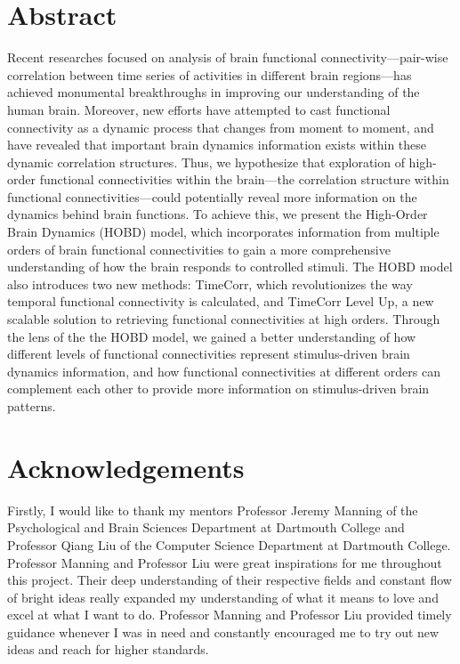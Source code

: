 \documentclass[11pt]{article}
\begin{document}
\section{Abstract}
Recent researches focused on analysis of brain functional connectivity---pair-wise correlation between time series of activities in different brain regions---has achieved monumental breakthroughs in improving our understanding of the human brain. Moreover, new efforts have attempted to cast functional connectivity as a dynamic process that changes from moment to moment, and have revealed that important brain dynamics information exists within these dynamic correlation structures. Thus, we hypothesize that exploration of high-order functional connectivities within the brain---the correlation structure within functional connectivities---could potentially reveal more information on the dynamics behind brain functions. To achieve this, we present the High-Order Brain Dynamics (HOBD) model, which incorporates information from multiple orders of brain functional connectivities to gain a more comprehensive understanding of how the brain responds to controlled stimuli. The HOBD model also introduces two new methods: TimeCorr, which revolutionizes the way temporal functional connectivity is calculated, and TimeCorr Level Up, a new scalable solution to retrieving functional connectivities at high orders. Through the lens of the the HOBD model, we gained a better understanding of how different levels of functional connectivities represent stimulus-driven brain dynamics information, and how functional connectivities at different orders can complement each other to provide more information on stimulus-driven brain patterns.

\newpage
\section{Acknowledgements}
Firstly, I would like to thank my mentors Professor Jeremy Manning of the Psychological and Brain Sciences Department at Dartmouth College and Professor Qiang Liu of the Computer Science Department at Dartmouth College. Professor Manning and Professor Liu were great inspirations for me throughout this project. Their deep understanding of their respective fields and constant flow of bright ideas really expanded my understanding of what it means to love and excel at what I want to do. Professor Manning and Professor Liu provided timely guidance whenever I was in need and constantly encouraged me to try out new ideas and reach for higher standards.
\end{document}
